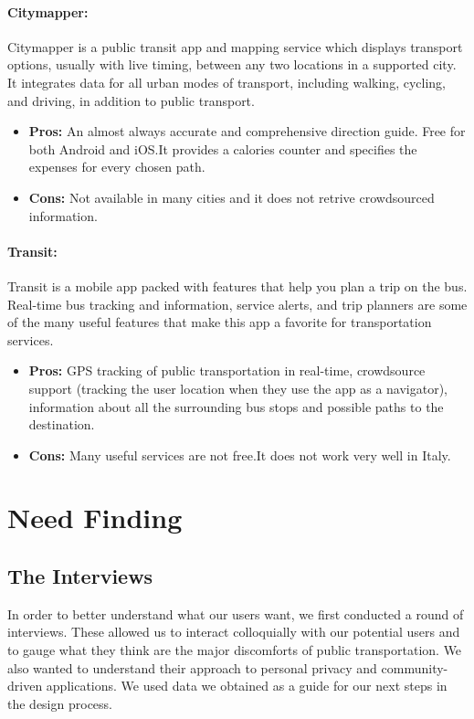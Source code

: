 \documentclass[a4paper, 11pt]{report}
\begin{document}
\paragraph{Citymapper:} Citymapper is a public transit app and mapping service which displays transport options, usually with live timing, between any two locations in a supported city. It integrates data for all urban modes of transport, including walking, cycling, and driving, in addition to public transport.

\begin{itemize}
	\item \textbf{Pros:} An almost always accurate and comprehensive direction guide. Free for both Android and iOS.\@ It provides a calories counter and 	specifies the expenses for every chosen path.
	\item \textbf{Cons:} Not available in many cities and it does not retrive crowdsourced information.
\end{itemize}

\paragraph{Transit:}  Transit is a mobile app packed with features that help you plan a trip on the bus. Real-time bus tracking and information, service alerts, and trip planners are some of the many useful features that make this app a favorite for transportation services.

\begin{itemize}
	\item \textbf{Pros:} GPS tracking of public transportation in real-time, crowdsource support (tracking the user location when they use the app as a navigator), information about all the surrounding bus stops and possible paths to the destination.
	\item \textbf{Cons:} Many useful services are not free.\@ It does not work very well in Italy.
\end{itemize}

\section{Need Finding}\label{sec:need-finding}

\subsection{The Interviews}\label{ssec:the-interviews}

In order to better understand what our users want, we first conducted a round of interviews.
These allowed us to interact colloquially with our potential users and to gauge what they think
are the major discomforts of public transportation. We also wanted to understand their approach
to personal privacy and community-driven applications. We used data we obtained as a guide for our
next steps in the design process.
\end{document}

